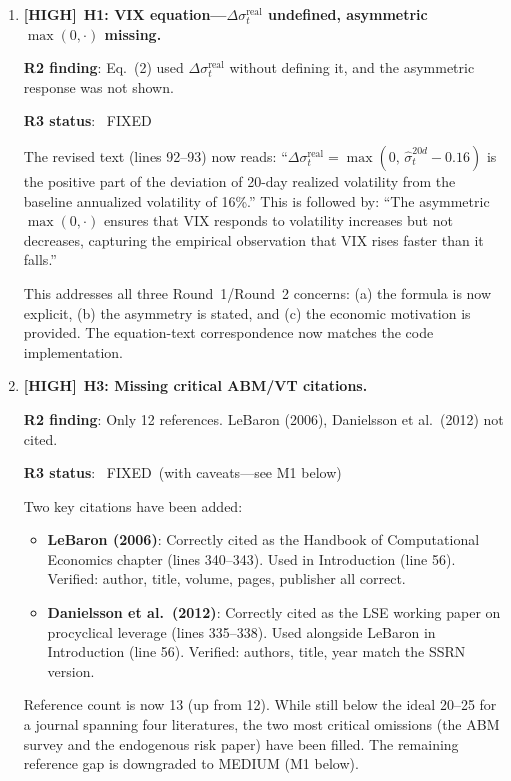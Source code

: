 \documentclass[12pt,a4paper]{article}
\newcommand{\HIGH}{\textbf{\textcolor{errorred}{[HIGH]}}}
\newcommand{\FIXED}{\textcolor{okgreen}{\checkmark\ FIXED}}
\begin{document}
\begin{enumerate}

\item \HIGH\ \textbf{H1: VIX equation---$\Delta\sigma^{\text{real}}_t$ undefined, asymmetric $\max(0,\cdot)$ missing.}

\textbf{R2 finding}: Eq.~(2) used $\Delta\sigma^{\text{real}}_t$ without defining it, and the asymmetric response was not shown.

\textbf{R3 status}: \FIXED

The revised text (lines 92--93) now reads: ``$\Delta\sigma^{\text{real}}_t = \max(0,\, \hat{\sigma}^{20d}_t - 0.16)$ is the positive part of the deviation of 20-day realized volatility from the baseline annualized volatility of 16\%.'' This is followed by: ``The asymmetric $\max(0, \cdot)$ ensures that VIX responds to volatility increases but not decreases, capturing the empirical observation that VIX rises faster than it falls.''

This addresses all three Round~1/Round~2 concerns: (a) the formula is now explicit, (b) the asymmetry is stated, and (c) the economic motivation is provided. The equation-text correspondence now matches the code implementation.

\medskip

\item \HIGH\ \textbf{H3: Missing critical ABM/VT citations.}

\textbf{R2 finding}: Only 12 references. LeBaron (2006), Danielsson et al.\ (2012) not cited.

\textbf{R3 status}: \FIXED\ (with caveats---see M1 below)

Two key citations have been added:
\begin{itemize}[nosep]
  \item \textbf{LeBaron (2006)}: Correctly cited as the Handbook of Computational Economics chapter (lines 340--343). Used in Introduction (line 56). Verified: author, title, volume, pages, publisher all correct.
  \item \textbf{Danielsson et al.\ (2012)}: Correctly cited as the LSE working paper on procyclical leverage (lines 335--338). Used alongside LeBaron in Introduction (line 56). Verified: authors, title, year match the SSRN version.
\end{itemize}

Reference count is now 13 (up from 12). While still below the ideal 20--25 for a journal spanning four literatures, the two most critical omissions (the ABM survey and the endogenous risk paper) have been filled. The remaining reference gap is downgraded to MEDIUM (M1 below).

\end{enumerate}
\end{document}
